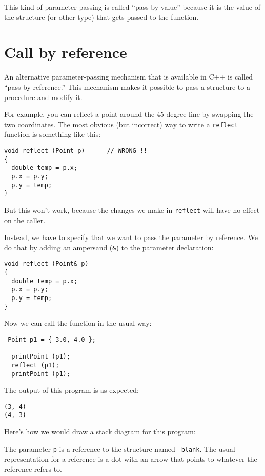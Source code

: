 This kind of parameter-passing is called ``pass by value''
because it is the value of the structure (or other type) that
gets passed to the function.

\section{Call by reference}
\label{reference}

An alternative parameter-passing mechanism that is available
in C++ is called ``pass by reference.''  This mechanism makes
it possible to pass a structure to a procedure and modify it.

For example, you can reflect a point around the 45-degree line by
swapping the two coordinates.  The most obvious (but incorrect) way to
write a {\tt reflect} function is something like this:

\begin{verbatim}
void reflect (Point p)      // WRONG !!
{
  double temp = p.x;
  p.x = p.y;
  p.y = temp;
}
\end{verbatim}
%
But this won't work, because the changes we make in {\tt reflect}
will have no effect on the caller.

Instead, we have to specify that we want to pass the parameter by
reference.  We do that by adding an ampersand ({\tt \&}) to the
parameter declaration:

\begin{verbatim}
void reflect (Point& p)
{
  double temp = p.x;
  p.x = p.y;
  p.y = temp;
}
\end{verbatim}
%
Now we can call the function in the usual way:

\begin{verbatim}
 Point p1 = { 3.0, 4.0 };
 
  printPoint (p1);
  reflect (p1);
  printPoint (p1);
\end{verbatim}
%
The output of this program is as expected:

\begin{verbatim}
(3, 4)
(4, 3)
\end{verbatim}
%
Here's how we would draw a stack diagram for this program:

\vspace{0.1in}
\centerline{}
\vspace{0.1in}
%
The parameter {\tt p} is a reference to the structure named {\tt
blank}.  The usual representation for a reference is a dot with an
arrow that points to whatever the reference refers to.

